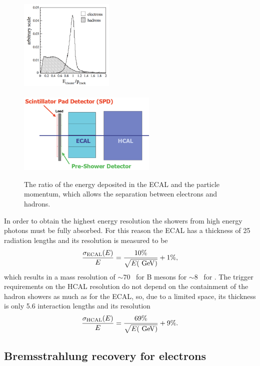 \begin{figure}[t!]
\centering
\includegraphics[width=0.4\textwidth,height=5.3cm]{Detector/figs/pi0_e_pid_perf.png}
\includegraphics[width=0.59\textwidth]{Detector/figs/calo_layout.png}
\caption{The ratio of the energy deposited in the ECAL and the particle momentum, which allows
the separation between electrons and hadrons. }
\label{fig:pi0_e_pid_perf}
\end{figure}

In order to obtain the highest energy resolution the showers from high energy photons 
must be fully absorbed. For this reason the ECAL has a thickness of 25 radiation lengths and its resolution is 
measured to be~\cite{Alves:2008zz}
 \begin{equation}
 \frac{\sigma_{\rm ECAL}(E)}{E} = \frac{10\%}{\sqrt{E(\gev )}} + 1\%,
 \end{equation}
%
which results in a mass resolution of $\sim 70$ \mevcc~for B mesons for $\sim 8$ \mevcc~for \piz.
The trigger requirements on the HCAL resolution do not depend on the containment of the hadron showers as much 
as for the ECAL, so, due to a limited space, its thickness is only 5.6 interaction lengths and its resolution
%
 \begin{equation}
 \frac{\sigma_{\rm HCAL}(E)}{E} = \frac{69\%}{\sqrt{E(\gev )}} + 9\%.
 \end{equation}

\subsection{Bremsstrahlung recovery for electrons}

